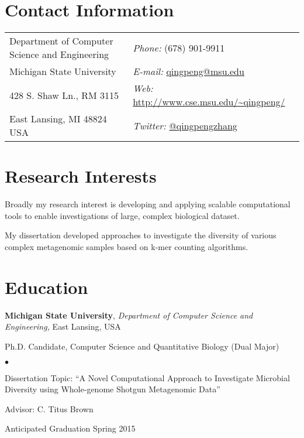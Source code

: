 \documentclass[margin,line]{res}
\newenvironment{list1}{
  \begin{list}{\ding{113}}{%
      \setlength{\itemsep}{0in}
      \setlength{\parsep}{0in} \setlength{\parskip}{0in}
      \setlength{\topsep}{0in} \setlength{\partopsep}{0in} 
      \setlength{\leftmargin}{0.17in}}}{\end{list}}
\newenvironment{list2}{
  \begin{list}{$\bullet$}{%
      \setlength{\itemsep}{0in}
      \setlength{\parsep}{0in} \setlength{\parskip}{0in}
      \setlength{\topsep}{0in} \setlength{\partopsep}{0in} 
      \setlength{\leftmargin}{0.2in}}}{\end{list}}
\begin{document}

\begin{resume}
\section{\sc Contact Information}
\vspace{.05in}
\begin{tabular}{@{}p{3in}p{3in}}
Department of Computer Science and Engineering  & {\it Phone:}  (678) 901-9911 \\            
Michigan State University & {\it E-mail:} \url{qingpeng@msu.edu} \\       
428 S. Shaw Ln., RM 3115 & {\it Web:} \url{http://www.cse.msu.edu/~qingpeng/} \\ 
East Lansing, MI  48824 USA  & {\it Twitter:} \href{http://twitter.com/qingpengzhang}{@qingpengzhang}\\     
\end{tabular}


\section{\sc Research Interests}

Broadly my research interest is developing and applying scalable computational tools to enable investigations of large, complex biological dataset.

My dissertation developed approaches to investigate the diversity of various complex metagenomic samples based on k-mer counting algorithms.  

\section{\sc Education}
{\bf Michigan State University}, {\em Department of Computer Science and 
Engineering,} East Lansing, USA\\
\vspace*{-.1in}
\begin{list1}
\item[] Ph.D. Candidate, Computer Science and Quantitative Biology (Dual Major)
\begin{list2}
\vspace*{.05in}
    \item Dissertation Topic:  ``A Novel Computational Approach to Investigate
    Microbial Diversity using Whole-genome Shotgun Metagenomic Data'' 
    \item Advisor:  C. Titus Brown
    \item Anticipated Graduation Spring 2015
\end{list2}
\end{list1}


\end{resume}
\end{document}
